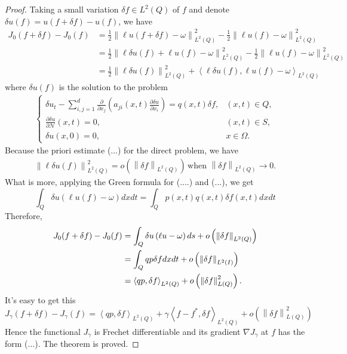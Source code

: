 \documentclass[]{article}
\begin{document}
\begin{proof}
	Taking a small variation $\delta f \in L^2(Q)$ of $f$ and denote $\delta u(f)=u(f+\delta f)-u(f)$, we have
	\begin{align*}
		J_0(f+\delta f)-J_0(f)&=\frac{1}{2}\left\|\ell u(f+\delta f)-\omega\right\|^2_{L^2(Q)}-\frac{1}{2}\left\|\ell u(f)-\omega\right\|^2_{L^2(Q)}\\
		&=\frac{1}{2}\left\|\ell \delta u(f) +\ell u(f)-\omega\right\|^2_{L^2(Q)}-\frac{1}{2}\left\|\ell u(f)-\omega\right\|^2_{L^2(Q)}\\
		&=\frac{1}{2}\left\|\ell \delta u(f)\right\|^2_{L^2(Q)}+\left\langle \ell \delta u(f), \ell u(f)-\omega\right\rangle_{L^2(Q)}
	\end{align*}
	where $\delta u(f)$ is the solution to the problem
	\begin{align}\label{3.6}
		\begin{cases}
			\delta u_t-\sum\limits_{i, j=1}^{d}\frac{\partial}{\partial x_j}\left(a_{ji}(x, t)\frac{\partial \delta u}{\partial x_i}\right)=q(x, t)\delta f,&(x, t)\in Q,\\
			\frac{\partial \delta u}{\partial \mathcal{N}}(x, t)=0, & (x, t)\in S,\\
			\delta u(x, 0)=0, &x\in \Omega.
		\end{cases}
	\end{align}
	Because the priori estimate (...) for the direct problem, we have
	\begin{align*}
		\left\|\ell\delta u(f)\right\|_{L^2(Q)}^2=o\left(\left\|\delta f\right\|_{L^2(Q)}\right)\, \text{when } \left\|\delta f\right\|_{L^2(Q)}\to 0.
	\end{align*}
	What is more, applying the Green formula for (....) and (...), we get
	$$\int_{Q} \delta u \left(\ell u(f)-\omega\right)dxdt=\int_{Q} p(x, t)q(x, t)\delta f(x, t)dxdt$$
	Therefore,
	\begin{align}
		J_0(f+\delta f)-J_0(f)&=\int_{Q}\delta u\left(\ell u-\omega\right)ds+o\left(\left\|\delta f\right\|_{L^2(Q)}\right)\notag\\
		&=\int_Q qp\delta fdxdt+o\left(\left\|\delta f\right\|_{L^2(I)}\right)\notag\\
		&=\left\langle qp,\delta f \right\rangle_{L^2(Q)}+o\left(\left\|\delta f\right\|^2_{L(Q)}\right).\label{3.7}
	\end{align}
	It's easy to get this
	$$J_\gamma(f+\delta f)-J_\gamma(f)=\left\langle qp,\delta f \right\rangle_{L^2(Q)}+\gamma\left\langle f-f^*,\delta f \right\rangle_{L^2(Q)}+o\left(\left\|\delta f\right\|^2_{L(Q)}\right)$$
	Hence the functional $J_\gamma$ is Frechet differentiable and its gradient $\nabla J_\gamma$ at $f$ has the form (...). The theorem is proved.
\end{proof}
\end{document}
